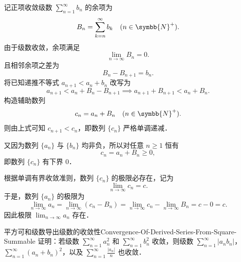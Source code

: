 \begin{myproof}
    记正项收敛级数 $\sum_{n=1}^\infty b_n$ 的余项为
    \begin{equation}
        B_n = \sum_{k=n}^\infty b_k \quad (n \in \symbb{N}^+).
    \end{equation}
    由于级数收敛，余项满足
    \begin{equation}
        \lim_{n\to\infty} B_n = 0.
    \end{equation}
    且相邻余项之差为
    \begin{equation}
        B_n - B_{n+1} = b_n.
    \end{equation}
    将已知递推不等式 $a_{n+1} < a_n + b_n$ 改写为
    \begin{equation}
        a_{n+1} < a_n + B_n - B_{n+1} \implies a_{n+1} + B_{n+1} < a_n + B_n.
    \end{equation}
    构造辅助数列
    \begin{equation}
        c_n = a_n + B_n \quad (n \in \symbb{N}^+).
    \end{equation}
    则由上式可知 $c_{n+1} < c_n$，即数列 $\{c_n\}$ 严格单调递减．

    又因为数列 $\{a_n\}$ 与 $\{b_n\}$ 均非负，所以对任意 $n \geqslant 1$ 恒有
    \begin{equation}
        c_n = a_n + B_n \geqslant 0,
    \end{equation}
    即数列 $\{c_n\}$ 有下界 $0$．

    根据单调有界收敛准则，数列 $\{c_n\}$ 的极限必存在，记为
    \begin{equation}
        \lim_{n\to\infty} c_n = c.
    \end{equation}
    于是，数列 $\{a_n\}$ 的极限为
    \begin{equation}
        \lim_{n\to\infty} a_n = \lim_{n\to\infty} (c_n - B_n) = \lim_{n\to\infty} c_n - \lim_{n\to\infty} B_n = c - 0 = c.
    \end{equation}
    因此极限 $\lim_{n\to\infty} a_n$ 存在．
\end{myproof}

\begin{problem}{平方可和级数导出级数的收敛性}{Convergence-Of-Derived-Series-From-Square-Summable}
    证明：若级数 $\sum_{n=1}^\infty a_n^2$ 和 $\sum_{n=1}^\infty b_n^2$ 收敛，则级数 $\sum_{n=1}^\infty |a_n b_n|$，$\sum_{n=1}^\infty (a_n + b_n)^2$，以及 $\sum_{n=1}^\infty \frac{|a_n|}{n}$ 也收敛．
\end{problem}

